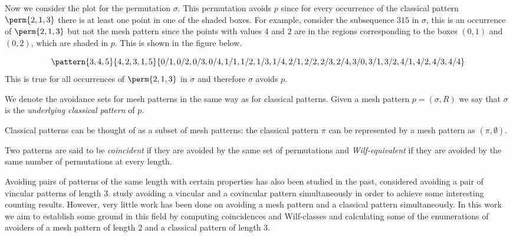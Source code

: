 Now we consider the plot for the permutation \(\sigma\). This permutation
avoids \(p\) since for every occurrence of the classical pattern \(\perm{2,1,3}\)
there is at least one point in one of the shaded boxes. For example, consider the
subsequence \(315\) in \(\sigma\), this is an occurrence of \(\perm{2,1,3}\) but
not the mesh pattern since the points with values \(4\) and \(2\) are in the
regions corresponding to the boxes \((0,1)\) and \((0,2)\), which are shaded in
\(p\). This is shown in the figure below.

\begin{equation*}
    \pattern{3,4,5}{4,2,3,1,5}{0/1,0/2,0/3,0/4,
                               1/1,1/2,1/3,1/4,
                               2/1,2/2,2/3,2/4,
                               3/0,3/1,3/2,
                               4/1,4/2,4/3,4/4}
\end{equation*}
This is true for all occurrences of \(\perm{2,1,3}\) in \(\sigma\) and
therefore \(\sigma\) avoids \(p\).

We denote the avoidance sets for mesh patterns in the same way as for
classical patterns. Given a mesh pattern \(p=(\sigma,R)\) we say that \(\sigma\) is the \emph{underlying
classical pattern} of \(p\).
\begin{note}
    \label{not:classmesh}
    Classical patterns can be thought of as a subset of mesh patterns: the
    classical pattern \(\pi\) can be represented by a mesh pattern as
    \((\pi,\emptyset)\).
\end{note}

Two patterns are said to be \emph{coincident} if they are avoided by the same set of
permutations and \emph{Wilf-equivalent} if they are avoided by the same number of permutations
at every length.

Avoiding pairs of patterns of the same length with certain properties has
also been studied in the past, \textcite{MR2178749} considered avoiding a
pair of vincular patterns of length 3. \textcite{2015arXiv151203226B} study avoiding
a vincular and a covincular pattern simultaneously in order to achieve some
interesting counting results. However, very little work has been done on avoiding
a mesh pattern and a classical pattern simultaneously. In this work we aim to
establish some ground in this field by computing coincidences and Wilf-classes
and calculating some of the enumerations of avoiders of a mesh pattern of length
2 and a classical pattern of length 3.

